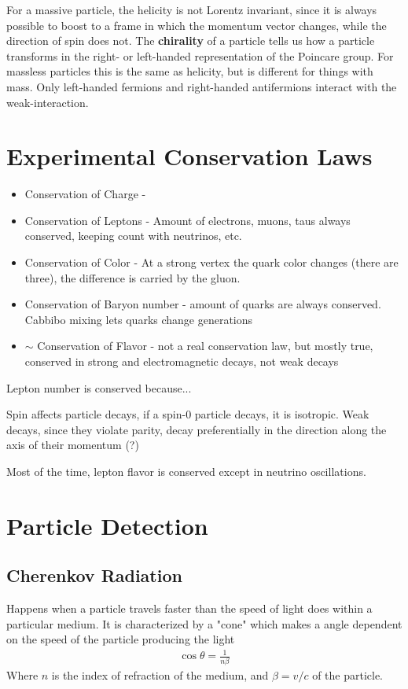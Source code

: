 For a massive particle, the helicity is not Lorentz invariant, since it is always possible to boost to a frame in which the momentum vector changes, while the direction of spin does not. The \textbf{chirality} of a particle tells us how a particle transforms in the right- or left-handed representation of the Poincare group. For massless particles this is the same as helicity, but is different for things with mass. Only left-handed fermions and right-handed antifermions interact with the weak-interaction.



\section{Experimental Conservation Laws}

\begin{itemize}
    \item Conservation of Charge - 
    \item Conservation of Leptons - Amount of electrons, muons, taus always conserved, keeping count with neutrinos, etc.
    \item Conservation of Color - At a strong vertex the quark color changes (there are three), the difference is carried by the gluon.
    \item Conservation of Baryon number - amount of quarks are always conserved. Cabbibo mixing lets quarks change generations
    \item $\sim$ Conservation of Flavor - not a real conservation law, but mostly true, conserved in strong and electromagnetic decays, not weak decays
\end{itemize}
Lepton number is conserved because...

Spin affects particle decays, if a spin-0 particle decays, it is isotropic. Weak decays, since they violate parity, decay preferentially in the direction along the axis of their momentum (?)


Most of the time, lepton flavor is conserved except in neutrino oscillations.

\section{Particle Detection}
\subsection{Cherenkov Radiation}
Happens when a particle travels faster than the speed of light does within a particular medium. It is characterized by a "cone" which makes a angle dependent on the speed of the particle producing the light
\begin{align}
\cos\theta =\frac{1}{n\beta}
\end{align}
Where $n$ is the index of refraction of the medium, and $\beta = v/c$ of the particle.

